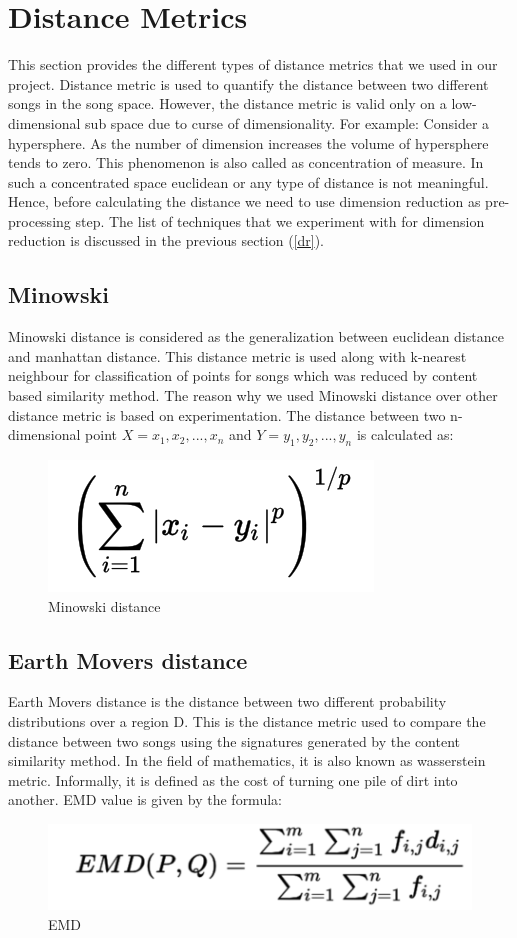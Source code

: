 \documentclass[12pt]{article}
\begin{document}
\section{Distance Metrics}\label{sec:dist}
This section provides the different types of distance metrics that we used in our project. Distance metric is used to quantify the distance between two different songs in the song space. However, the distance metric is valid only on a low-dimensional sub space due to curse of dimensionality. For example: Consider a hypersphere. As the number of dimension increases the volume of hypersphere tends to zero. This phenomenon is also called as concentration of measure. In such a concentrated space euclidean or any type of distance is not meaningful. Hence, before calculating the distance we need to use dimension reduction as pre-processing step. The list of techniques that we experiment with for dimension reduction is discussed in the previous section (\ref{dr}).


\subsection{Minowski}
Minowski distance is considered as the generalization between euclidean distance and manhattan distance. This distance metric is used along with k-nearest neighbour for classification of points for songs which was reduced by content based similarity method. The reason why we used Minowski distance over other distance metric is based on experimentation. The distance between two n-dimensional point $ X = {x_1,x_2,...,x_n}$ and $ Y = {y_1,y_2,...,y_n} $ is calculated as:
\begin{figure}[h]\label{minowski}
\center
\includegraphics{fig3.png}
\caption{Minowski distance}
\end{figure}
\subsection{Earth Movers distance}
Earth Movers distance is the distance between two different probability distributions over a region D. This is the distance metric used to compare the distance between two songs using the signatures generated by the content similarity method. In the field of mathematics, it is also known as wasserstein metric. Informally, it is defined as the cost of turning one pile of dirt into another. EMD value is given by the formula:
\begin{figure}[h]\label{emd}
\center
\includegraphics[scale=0.5]{emd.png}
\caption{EMD}
\end{figure}
\end{document}
